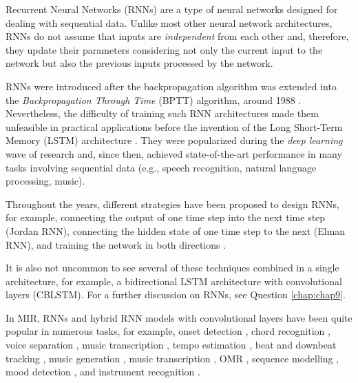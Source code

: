 

Recurrent Neural Networks (RNNs) are a type of neural
networks designed for dealing with sequential data. Unlike
most other neural network architectures, RNNs do not assume
that inputs are \emph{independent} from each other and,
therefore, they update their parameters considering not only
the current input to the network but also the previous
inputs processed by the network.

RNNs were introduced after the backpropagation algorithm
\parencite{rumelhart1988learning} was extended into the
\emph{Backpropagation Through Time} (BPTT) algorithm, around
1988 \parencite{werbos1988generalization,
werbos1990backpropagation}. Nevertheless, the difficulty of
training such RNN architectures made them unfeasible in
practical applications before the invention of the Long
Short-Term Memory (LSTM) architecture
\parencite{hochreiter1997long}. They were popularized during
the \emph{deep learning} wave of research and, since then,
achieved state-of-the-art performance in many tasks
involving sequential data (e.g., speech recognition, natural
language processing, music).

Throughout the years, different strategies have been
proposed to design RNNs, for example, connecting the output
of one time step into the next time step (Jordan RNN),
connecting the hidden state of one time step to the next
(Elman RNN), and training the network in both directions
\parencite{schuster1997bidirectional}.

It is also not uncommon to see several of these techniques
combined in a single architecture, for example, a
bidirectional LSTM architecture with convolutional layers
(CBLSTM). For a further discussion on RNNs, see Question
\ref{chap:chap9}.

In MIR, RNNs and hybrid RNN models with convolutional layers
have been quite popular in numerous tasks, for example,
onset detection \parencite{eyben2010universal}, chord
recognition \parencite{boulangerlewandowski2013audio,
sigtia2016endend, sears2018evaluating}, voice separation
\parencite{huang2014singingvoice}, music transcription
\parencite{sigtia2014rnnbased}, tempo estimation
\parencite{bock2015accurate}, beat and downbeat tracking
\parencite{bock2016joint, krebs2016downbeat}, music
generation \parencite{liu2016predicting, liang2017automatic,
lim2017chord}, music transcription
\parencite{rigaud2016singing, sigtia2016endend,
southall2016automatic, vogl2016recurrent,
southall2017automatic, vogl2017drum, basaran2018main}, OMR
\parencite{calvozaragoza2017onestep, wel2017optical,
calvozaragoza2018cameraprimus}, sequence modelling
\parencite{ycart2017study}, mood detection
\parencite{delbouys2018music}, and instrument recognition
\parencite{gururani2018instrument}.



